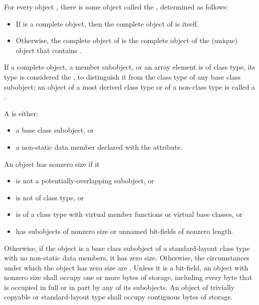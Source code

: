 \pnum
For every object , there is some object called the
 , determined as follows:
\begin{itemize}
\item
If  is a complete object, then the complete object
of  is itself.

\item
Otherwise, the complete object of  is the complete object
of the (unique) object that contains .
\end{itemize}

\pnum
If a complete object, a member subobject, or an array element is of
class type, its type is considered the , to distinguish it from the class type of any base class subobject;
an object of a most derived class type or of a non-class type is called a
.

\pnum
A  is either:
\begin{itemize}
\item a base class subobject, or
\item a non-static data member
declared with the  attribute.
\end{itemize}

\pnum
{}%
%
An object has nonzero size if it
\begin{itemize}
\item is not a potentially-overlapping subobject, or
\item is not of class type, or
\item is of a class type with virtual member functions or virtual base classes, or
\item has subobjects of nonzero size or unnamed bit-fields of nonzero length.
\end{itemize}
Otherwise, if the object is a base class subobject
of a standard-layout class type
with no non-static data members,
it has zero size.
Otherwise, the circumstances under which the object has zero size
are .
%
Unless it is a bit-field,
an object with nonzero size
shall occupy one or more bytes of storage,
including every byte that is occupied in full or in part
by any of its subobjects.
An object of trivially copyable or
standard-layout type shall occupy contiguous bytes of
storage.


